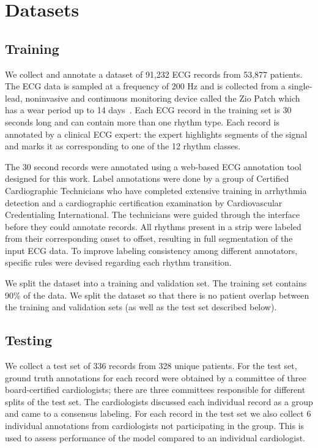 \section{Datasets}
\label{sec:arrhythmias:data}

\subsection{Training}

We collect and annotate a dataset of 91,232 ECG records from 53,877 patients.
The ECG data is sampled at a frequency of 200 Hz and is collected from a
single-lead, noninvasive and continuous monitoring device called the Zio Patch
which has a wear period up to 14 days~\cite{turakhia2013diagnostic}. Each ECG
record in the training set is 30 seconds long and can contain more than one
rhythm type. Each record is annotated by a clinical ECG expert: the expert
highlights segments of the signal and marks it as corresponding to one of the
12 rhythm classes.

The 30 second records were annotated using a web-based ECG annotation tool
designed for this work. Label annotations were done by a group of Certified
Cardiographic Technicians who have completed extensive training in arrhythmia
detection and a cardiographic certification examination by Cardiovascular
Credentialing International. The technicians were guided through the interface
before they could annotate records. All rhythms present in a strip were labeled
from their corresponding onset to offset, resulting in full segmentation of the
input ECG data. To improve labeling consistency among different annotators,
specific rules were devised regarding each rhythm transition.

We split the dataset into a training and validation set. The training set
contains 90\% of the data. We split the dataset so that there is no patient
overlap between the training and validation sets (as well as the test set
described below).

\subsection{Testing}

We collect a test set of 336 records from 328 unique patients. For the test
set, ground truth annotations for each record were obtained by a committee of
three board-certified cardiologists; there are three committees responsible for
different splits of the test set. The cardiologists discussed each individual
record as a group and came to a consensus labeling. For each record in the test
set we also collect 6 individual annotations from cardiologists not
participating in the group. This is used to assess performance of the model
compared to an individual cardiologist.

